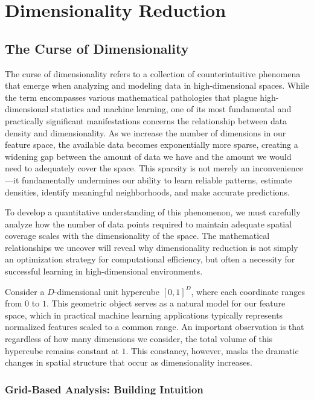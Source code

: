 \chapter{Dimensionality Reduction}

\section*{The Curse of Dimensionality}

The curse of dimensionality refers to a collection of counterintuitive phenomena that emerge when analyzing and modeling data in high-dimensional spaces. While the term encompasses various mathematical pathologies that plague high-dimensional statistics and machine learning, one of its most fundamental and practically significant manifestations concerns the relationship between data density and dimensionality. As we increase the number of dimensions in our feature space, the available data becomes exponentially more sparse, creating a widening gap between the amount of data we have and the amount we would need to adequately cover the space. This sparsity is not merely an inconvenience—it fundamentally undermines our ability to learn reliable patterns, estimate densities, identify meaningful neighborhoods, and make accurate predictions.

To develop a quantitative understanding of this phenomenon, we must carefully analyze how the number of data points required to maintain adequate spatial coverage scales with the dimensionality of the space. The mathematical relationships we uncover will reveal why dimensionality reduction is not simply an optimization strategy for computational efficiency, but often a necessity for successful learning in high-dimensional environments.

Consider a $D$-dimensional unit hypercube $[0,1]^D$, where each coordinate ranges from $0$ to $1$. This geometric object serves as a natural model for our feature space, which in practical machine learning applications typically represents normalized features scaled to a common range. An important observation is that regardless of how many dimensions we consider, the total volume of this hypercube remains constant at $1$. This constancy, however, masks the dramatic changes in spatial structure that occur as dimensionality increases.

\subsection*{Grid-Based Analysis: Building Intuition}

